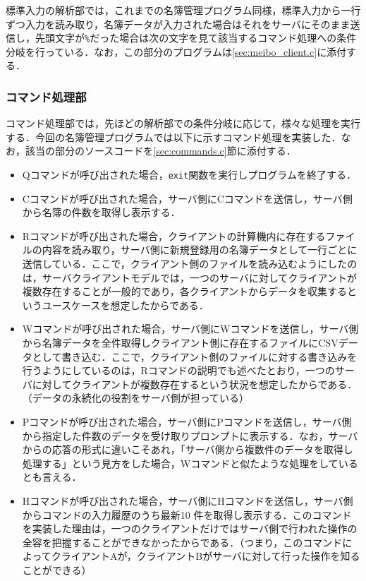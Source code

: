 \documentclass[11pt]{jsarticle}
\begin{document}
標準入力の解析部では，これまでの名簿管理プログラム同様，標準入力から一行ずつ入力を読み取り，名簿データが入力された場合はそれをサーバにそのまま送信し，先頭文字が{\tt \%}だった場合は次の文字を見て該当するコマンド処理への条件分岐を行っている．なお，この部分のプログラムは\ref{sec:meibo_client.c}に添付する．

\subsubsection{コマンド処理部}

コマンド処理部では，先ほどの解析部での条件分岐に応じて，様々な処理を実行する．今回の名簿管理プログラムでは以下に示すコマンド処理を実装した．なお，該当の部分のソースコードを\ref{sec:commands.c}節に添付する．

\begin{itemize}
      \item Qコマンドが呼び出された場合，{\tt exit}関数を実行しプログラムを終了する．
      \item Cコマンドが呼び出された場合，サーバ側にCコマンドを送信し，サーバ側から名簿の件数を取得し表示する．
      \item Rコマンドが呼び出された場合，クライアントの計算機内に存在するファイルの内容を読み取り，サーバ側に新規登録用の名簿データとして一行ごとに送信している．ここで，クライアント側のファイルを読み込むようにしたのは，サーバクライアントモデルでは，一つのサーバに対してクライアントが複数存在することが一般的であり，各クライアントからデータを収集するというユースケースを想定したからである．
      \item Wコマンドが呼び出された場合，サーバ側にWコマンドを送信し，サーバ側から名簿データを全件取得しクライアント側に存在するファイルにCSVデータとして書き込む．ここで，クライアント側のファイルに対する書き込みを行うようにしているのは，Rコマンドの説明でも述べたとおり，一つのサーバに対してクライアントが複数存在するという状況を想定したからである．（データの永続化の役割をサーバ側が担っている）
      \item Pコマンドが呼び出された場合，サーバ側にPコマンドを送信し，サーバ側から指定した件数のデータを受け取りプロンプトに表示する．なお，サーバからの応答の形式に違いこそあれ，「サーバ側から複数件のデータを取得し処理する」という見方をした場合，Wコマンドと似たような処理をしているとも言える．
      \item Hコマンドが呼び出された場合，サーバ側にHコマンドを送信し，サーバ側からコマンドの入力履歴のうち最新10
      件を取得し表示する．このコマンドを実装した理由は，一つのクライアントだけではサーバ側で行われた操作の全容を把握することができなかったからである．（つまり，このコマンドによってクライアントAが，クライアントBがサーバに対して行った操作を知ることができる）
\end{itemize}
\end{document}
